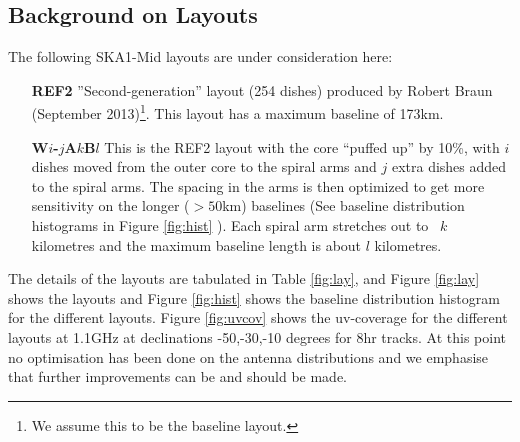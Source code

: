 \documentclass[sfheadings,a4paper,10pt,floats,floatfix]{article}
\begin{document}
\subsection{Background on Layouts}\label{sec:layouts}
The following SKA1-Mid layouts are under consideration here:
\begin{itemize}
\item[{\bf REF2}] ”Second-generation” layout (254 dishes) produced by Robert Braun (September 2013)\footnote{We assume this to be
the baseline layout.}. This layout has a maximum baseline of 173km. 
\item[{\bf W$i$-$j$A$k$B$l$}] This is the REF2 layout with the core ``puffed up'' by 10\%, with $i$ dishes moved from the outer
core to the spiral arms and $j$ extra dishes added to the spiral arms. The spacing in the arms is then optimized to get
more sensitivity on the longer ($>50$km) baselines (See baseline distribution histograms in Figure \ref{fig:hist} ). Each spiral
arm stretches out to ~$k$ kilometres and the maximum baseline length is about $l$ kilometres.
\end{itemize}
The details of the layouts are tabulated in Table \ref{fig:lay}, and Figure \ref{fig:lay} shows the layouts and Figure
\ref{fig:hist} shows the baseline distribution histogram for the different layouts. Figure \ref{fig:uvcov} shows the uv-coverage
for the different layouts at 1.1GHz at declinations -50,-30,-10 degrees for 8hr tracks. At this point no optimisation has been
done on the antenna distributions and we emphasise that further improvements can be and should be made.
\end{document}
